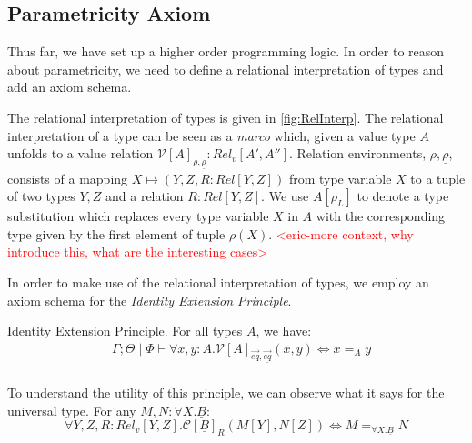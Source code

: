 \documentclass[acmsmall]{acmart}
\newcommand{\eric}[1]{\textcolor{red}{ <eric-#1> }}
\begin{document}


\subsection{Parametricity Axiom}
Thus far, we have set up a higher order programming logic. In order to reason about parametricity, we need to define a relational interpretation of types and add an axiom schema.

The relational interpretation of types is given in \cref{fig:RelInterp}. The relational interpretation of a type can be seen as a \textit{marco} which, given a value type $A$ unfolds to a value relation $\mathcal{V}[A]_{\rho,\underline{\rho}} : Rel_v[A',A'']$. Relation environments, $\rho,\underline{\rho}$, consists of a mapping $X\mapsto (Y,Z,R : Rel[Y,Z])$ from type variable $X$ to a tuple of two types $Y,Z$ and a relation $R : Rel[Y,Z]$. We use $A[\rho_L]$ to denote a type substitution which replaces every type variable $X$ in $A$ with the corresponding type given by the first element of tuple $\rho(X)$. \eric{more context, why introduce this, what are the interesting cases}

In order to make use of the relational interpretation of types, we employ an axiom schema for the \textit{Identity Extension Principle}.

\begin{definition}
  Identity Extension Principle. For all types $A$, we have:
  \begin{align*}
    &  \Gamma ; \Theta \;|\; \Phi \vdash \forall x,y : A. \mathcal{V}[A]_{\overrightarrow{eq},\underline{\overrightarrow{eq}}}(x,y) \iff x =_A y  \\ 
  \end{align*}
\end{definition}

To understand the utility of this principle, we can observe what it says for the universal type. For any $M,N : \forall X.\underline{B}$:
\[
  \forall Y,Z,R:Rel_v[Y,Z].\mathcal{C}[\underline{B}]_R(M[Y],N[Z]) \iff M =_{\forall X. \underline{B}} N
\]
\end{document}
